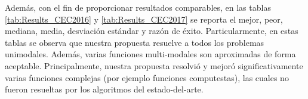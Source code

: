 Además, con el fin de proporcionar resultados comparables, en las tablas \ref{tab:Results_CEC2016} y \ref{tab:Results_CEC2017} se reporta el mejor, peor, mediana, media, desviación estándar y razón de éxito.
%
Particularmente, en estas tablas se observa que nuestra propuesta resuelve a todos los problemas unimodales.
%
Además, varias funciones multi-modales son aproximadas de forma aceptable.
%
Principalmente, nuestra propuesta resolvió y mejoró significativamente varias funciones complejas (por ejemplo funciones computestas), las cuales no fueron resueltas por los algoritmos del estado-del-arte.
%
